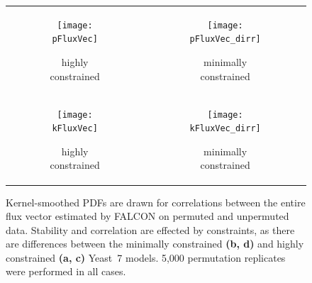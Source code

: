 \begin{figure}[!htb]
\centering
\begin{tabular}{cc}
  \begin{subfigure}[b]{0.5\textwidth}
  \texttt{[image: pFluxVec]}
  \caption{highly constrained} \label{fig:YpermCorrSup:A}
  \end{subfigure}
&
  \begin{subfigure}[b]{0.5\textwidth}
  \texttt{[image: pFluxVec\_dirr]}
  \caption{minimally constrained} \label{fig:YpermCorrSup:B}
  \end{subfigure} 
\\
  \begin{subfigure}[b]{0.5\textwidth}
  \texttt{[image: kFluxVec]}
  \caption{highly constrained} \label{fig:YpermCorrSup:C}
  \end{subfigure}
&
  \begin{subfigure}[b]{0.5\textwidth}
  \texttt{[image: kFluxVec\_dirr]}
  \caption{minimally constrained} \label{fig:YpermCorrSup:D}
  \end{subfigure} 
\\
\end{tabular}
\caption{Kernel-smoothed PDFs are drawn for correlations between
the entire flux vector estimated by FALCON on permuted and unpermuted
data. Stability and correlation are effected by constraints, as there
are differences between the minimally constrained \textbf{(b, d)} and
highly constrained \textbf{(a, c)} Yeast~7 models. 5,000 permutation
replicates were performed in all cases.}
\label{fig:YpermCorrSup}
\end{figure}
\FloatBarrier

